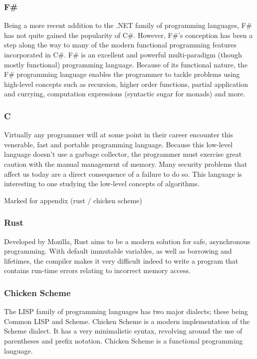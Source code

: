 \documentclass{article}
\begin{document}
\subsubsection{F\#}
Being a more recent addition to the .NET family of programming languages, F\# has not quite gained the popularity of C\#.
However, F\#'s conception has been a step along the way to many of the modern functional programming features incorporated in C\#.
F\# is an excellent and powerful multi-paradigm (though mostly functional) programming language.
Because of its functional nature, the F\# programming language enables the programmer to tackle problems using high-level concepts such as
recursion, higher order functions, partial application and currying, computation expressions (syntactic sugar for monads) and more.

\subsubsection{C}
Virtually any programmer will at some point in their career encounter this venerable, fast and portable programming language.
Because this low-level language doesn't use a garbage collector, the programmer must exercise great caution with the manual management of memory.
Many security problems that affect us today are a direct consequence of a failure to do so.
This language is interesting to one studying the low-level concepts of algorithms.

\huge Marked for appendix (rust / chicken scheme)
\subsubsection{Rust}
Developed by Mozilla, Rust aims to be a modern solution for safe, asynchronous programming.
With default immutable variables, as well as borrowing and lifetimes, the compiler makes it
very difficult indeed to write a program that contains run-time errors relating to incorrect memory access.

\subsubsection{Chicken Scheme}
The LISP family of programming languages has two major dialects; these being Common LISP and Scheme.
Chicken Scheme is a modern implementation of the Scheme dialect.
It has a very minimalistic syntax, revolving around the use of parentheses and prefix notation.
Chicken Scheme is a functional programming language.
\end{document}
